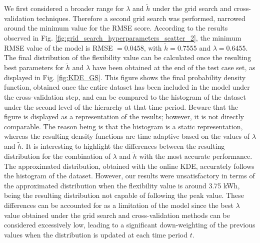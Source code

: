 We first considered a broader range for $\lambda$ and $\widetilde{h}$ under the grid search and cross-validation techniques. Therefore a second grid search was performed, narrowed around the minimum value for the RMSE score. According to the results observed in Fig. \ref{fig:grid_search_hyperparameters_scatter_2}, the minimum RMSE value of the model is RMSE $= 0.0458$, with $\widetilde{h}=0.7555$ and $\lambda=0.6455$. 
The final distribution of the flexibility value can be calculated once the resulting best parameters for $\widetilde{h}$ and $\lambda$ have been obtained at the end of the test case set, as displayed in Fig. \ref{fig:KDE_GS}. This figure shows the final probability density function, obtained once the entire dataset has been included in the model under the cross-validation step, and can be compared to the histogram of the dataset under the second level of the hierarchy at that time period. Beware that the figure is displayed as a representation of the results; however, it is not directly comparable. The reason being is that the histogram is a static representation, whereas the resulting density functions are time adaptive based on the values of $\lambda$ and $\widetilde{h}$. It is interesting to highlight the differences between the resulting distribution for the combination of $\lambda$ and $\widetilde{h}$ with the most accurate performance. The approximated distribution, obtained with the online KDE, accurately follows the histogram of the dataset. However, our results were unsatisfactory in terms of the approximated distribution when the flexibility value is around 3.75 kWh, being the resulting distribution not capable of following the peak value. These differences can be accounted for as a limitation of the model since the best $\lambda$ value obtained under the grid search and cross-validation methods can be considered excessively low, leading to a significant down-weighting of the previous values when the distribution is updated at each time period $t$. 







